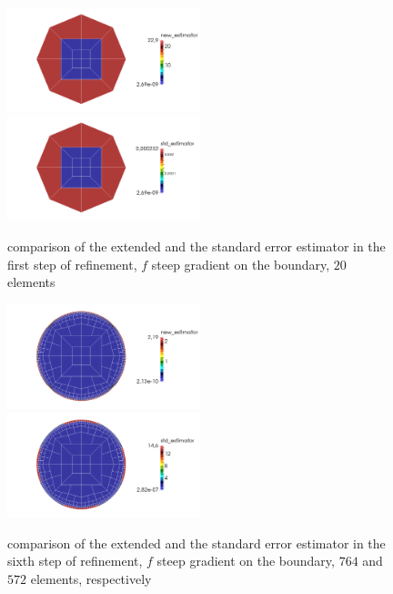 \documentclass[a4paper, 11pt, twoside]{article}
\begin{document}
\begin{figure}[htbp!]
   \includegraphics[width=0.50\textwidth]{fig/circle_est/circle_parabel_1.png}
   \hfill
  \includegraphics[width=0.50\textwidth]{fig/circle_std/circle_parabel_1.png}
     \caption{comparison of the extended and the standard error estimator in the first step of refinement, $f$ steep gradient on the boundary, $20$ elements}
\end{figure}

\begin{figure}[htbp!]
   \includegraphics[width=0.50\textwidth]{fig/circle_est/circle_parabel_6.png}
   \hfill
  \includegraphics[width=0.50\textwidth]{fig/circle_std/circle_parabel_6.png}
     \caption{comparison of the extended and the standard error estimator in the sixth step of refinement, $f$ steep gradient on the boundary, $764$ and $572$ elements, respectively}
\end{figure}
\end{document}
